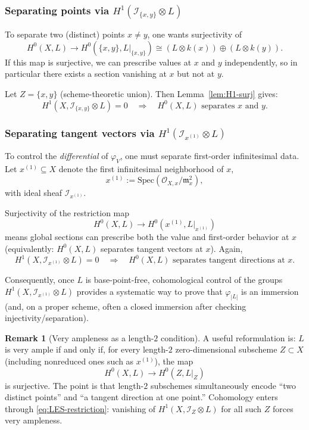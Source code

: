 \documentclass[11pt]{article}
\theoremstyle{definition}
\newtheorem{remark}[definition]{Remark}
\theoremstyle{plain}
\newcommand{\Spec}{\mathrm{Spec}}
\begin{document}
\subsubsection{Separating points via $H^1(\mathcal{I}_{\{x,y\}}\otimes L)$}

To separate two (distinct) points $x\neq y$, one wants surjectivity of
\[
H^0(X,L)\longrightarrow H^0(\{x,y\},L|_{\{x,y\}})\cong (L\otimes k(x))\oplus (L\otimes k(y)).
\]
If this map is surjective, we can prescribe values at $x$ and $y$ independently, so in particular there exists a section vanishing at $x$ but not at $y$.

Let $Z=\{x,y\}$ (scheme-theoretic union). Then Lemma~\ref{lem:H1-surj} gives:
\[
H^1(X,\mathcal{I}_{\{x,y\}}\otimes L)=0 \quad \Rightarrow \quad
\text{$H^0(X,L)$ separates $x$ and $y$.}
\]

\subsubsection{Separating tangent vectors via $H^1(\mathcal{I}_{x^{(1)}}\otimes L)$}

To control the \emph{differential} of $\varphi_V$, one must separate first-order infinitesimal data.
Let $x^{(1)}\subseteq X$ denote the first infinitesimal neighborhood of $x$,
\[
x^{(1)} := \Spec(\mathcal{O}_{X,x}/\mathfrak m_x^2),
\]
with ideal sheaf $\mathcal{I}_{x^{(1)}}$.

Surjectivity of the restriction map
\[
H^0(X,L)\longrightarrow H^0(x^{(1)},L|_{x^{(1)}})
\]
means global sections can prescribe both the value and first-order behavior at $x$ (equivalently: $H^0(X,L)$ separates tangent vectors at $x$). Again,
\[
H^1(X,\mathcal{I}_{x^{(1)}}\otimes L)=0 \quad \Rightarrow \quad
\text{$H^0(X,L)$ separates tangent directions at $x$.}
\]

Consequently, once $L$ is base-point-free, cohomological control of the groups
$H^1(X,\mathcal{I}_{x^{(1)}}\otimes L)$ provides a systematic way to prove that $\varphi_{|L|}$ is an immersion (and, on a proper scheme, often a closed immersion after checking injectivity/separation).

\begin{remark}[Very ampleness as a length-$2$ condition]
A useful reformulation is: $L$ is very ample if and only if, for every length-$2$ zero-dimensional subscheme $Z\subset X$ (including nonreduced ones such as $x^{(1)}$), the map
\[
H^0(X,L)\to H^0(Z,L|_Z)
\]
is surjective. The point is that length-$2$ subschemes simultaneously encode ``two distinct points'' and ``a tangent direction at one point.''
Cohomology enters through \eqref{eq:LES-restriction}: vanishing of $H^1(X,\mathcal{I}_Z\otimes L)$ for all such $Z$ forces very ampleness.
\end{remark}
\end{document}
